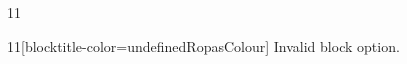 \documentclass[paper=A4]{ropas-poster}
\begin{document}
\begin{postergrid}{1}{1}
\begin{posterblock}{1}{1}[blocktitle-color=undefinedRopasColour]
Invalid block option.
\end{posterblock}
\end{postergrid}
\end{document}
